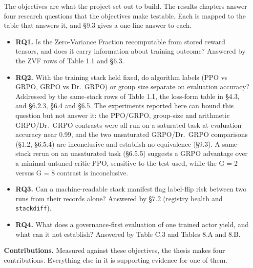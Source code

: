 \documentclass[12pt,a4paper]{report}
\providecommand{\tightlist}{%
  \setlength{\itemsep}{0pt}\setlength{\parskip}{0pt}}
\begin{document}
The objectives are what the project set out to build. The results
chapters answer four research questions that the objectives make
testable. Each is mapped to the table that answers it, and §9.3 gives a
one-line answer to each.

\begin{itemize}
\tightlist
\item
  \textbf{RQ1.} Is the Zero-Variance Fraction recomputable from stored
  reward tensors, and does it carry information about training outcome?
  Answered by the ZVF rows of Table 1.1 and §6.3.
\item
  \textbf{RQ2.} With the training stack held fixed, do algorithm labels
  (PPO vs GRPO, GRPO vs Dr.~GRPO) or group size separate on evaluation
  accuracy? Addressed by the same-stack rows of Table 1.1, the loss-form
  table in §4.3, and §6.2.3, §6.4 and §6.5. The experiments reported
  here can bound this question but not answer it: the PPO/GRPO,
  group-size and arithmetic GRPO/Dr.~GRPO contrasts were all run on a
  saturated task at evaluation accuracy near 0.99, and the two
  unsaturated GRPO/Dr.~GRPO comparisons (§1.2, §6.5.4) are inconclusive
  and establish no equivalence (§9.3). A same-stack rerun on an
  unsaturated task (§6.5.5) suggests a GRPO advantage over a minimal
  untuned-critic PPO, sensitive to the test used, while the G = 2 versus
  G = 8 contrast is inconclusive.
\item
  \textbf{RQ3.} Can a machine-readable stack manifest flag label-flip
  risk between two runs from their records alone? Answered by §7.2
  (registry health and \texttt{stackdiff}).
\item
  \textbf{RQ4.} What does a governance-first evaluation of one trained
  actor yield, and what can it not establish? Answered by Table C.3 and
  Tables 8.A and 8.B.
\end{itemize}

\textbf{Contributions.} Measured against these objectives, the thesis
makes four contributions. Everything else in it is supporting evidence
for one of them.
\end{document}
